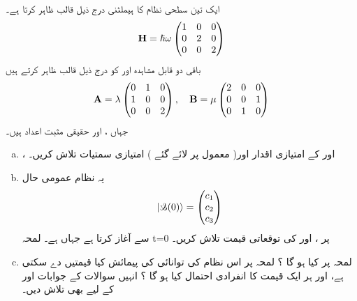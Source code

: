 ایک تین سطحی نظام کا ہیملٹنی درج ذیل قالب ظاہر کرتا ہے۔ 
 \begin{align*} 
\operatorname{\mathbf{H}}=\hslash\omega\begin{pmatrix}
1&0&0\\
0&2&0\\
0&0&2
\end{pmatrix} 
 \end{align*} 
باقی دو قابل مشاہدہ  اور  کو درج ذیل قالب ظاہر کرتے ہیں 
 \begin{align*} 
\operatorname{\mathbf{A}}=\lambda\begin{pmatrix}
0&1&0\\
1&0&0\\
0&0&2
\end{pmatrix} ,\quad \operatorname{\mathbf{B}}=\mu\begin{pmatrix}
2&0&0\\
0&0&1\\
0&1&0
\end{pmatrix}
 \end{align*} 
جہاں ،  اور  حقیقی مثبت اعداد ہیں۔
\begin{enumerate}[a.]
\item
{}،  اور  کے امتیازی اقدار اور( معمول پر لائے گئے ) امتیازی سمتیات تلاش کریں۔ 
 \item
 یہ نظام عمومی حال
 \begin{align*} 
| \s(0) \rangle=\begin{pmatrix}
c_{1}\\
c_{2}\\
c_{3}
\end{pmatrix} 
 \end{align*} 
سے آغاز کرتا ہے جہاں  ہے۔ لمحہ t=0 پر ،  اور کی توقعاتی قیمت تلاش کریں۔ 
\item
 لمحہ  پر  کیا ہو گا ؟ لمحہ پر اس نظام کی توانائی کی پیمائش کیا قیمتیں دے سکتی ہے، اور ہر ایک قیمت کا انفرادی احتمال کیا ہو گا ؟ انہیں سوالات کے جوابات  اور  کے لیے بھی تلاش دیں۔
 \end{enumerate}

